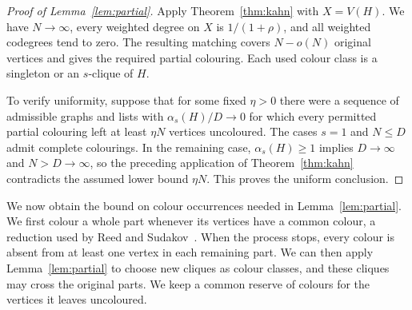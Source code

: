 \documentclass[11pt]{article}
\numberwithin{equation}{section}
\begin{document}
\begin{proof}[Proof of Lemma~\ref{lem:partial}]
Apply Theorem~\ref{thm:kahn} with $X=V(H)$. We have $N\to\infty$, every weighted degree on $X$ is $1/(1+\rho)$, and all weighted codegrees tend to zero. The resulting matching covers $N-o(N)$ original vertices and gives the required partial colouring. Each used colour class is a singleton or an $s$-clique of $H$.

To verify uniformity, suppose that for some fixed $\eta>0$ there were a sequence of admissible graphs and lists with $\alpha_s(H)/D\to0$ for which every permitted partial colouring left at least $\eta N$ vertices uncoloured. The cases $s=1$ and $N\le D$ admit complete colourings. In the remaining case, $\alpha_s(H)\ge1$ implies $D\to\infty$ and $N>D\to\infty$, so the preceding application of Theorem~\ref{thm:kahn} contradicts the assumed lower bound $\eta N$. This proves the uniform conclusion.
\end{proof}

We now obtain the bound on colour occurrences needed in Lemma~\ref{lem:partial}. We first colour a whole part whenever its vertices have a common colour, a reduction used by Reed and Sudakov~\cite[proof of Theorem~1]{ReedSudakov2002}. When the process stops, every colour is absent from at least one vertex in each remaining part.   {We can then apply Lemma~\ref{lem:partial} to choose new cliques as colour classes, and these cliques may cross the original parts.} We keep a common reserve of colours for the vertices it leaves uncoloured.
\end{document}
